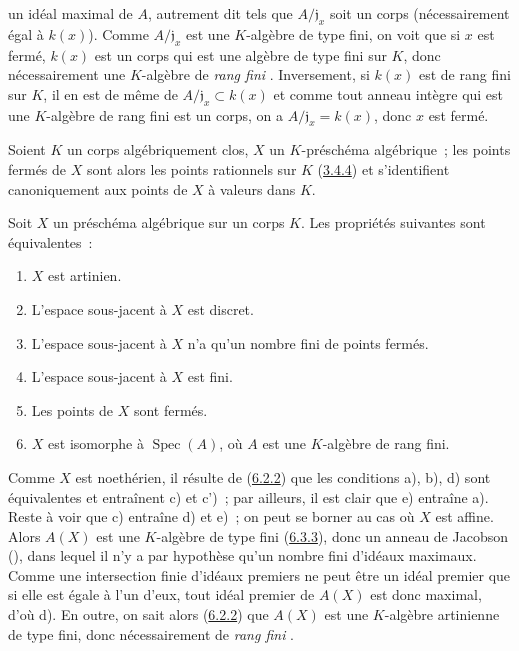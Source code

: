 un idéal maximal de $A$, autrement dit tels que $A/\mathfrak{j}_x$ soit un
corps (nécessairement égal à $k(x)$). Comme $A/\mathfrak{j}_x$ est une
$K$-algèbre de type fini, on voit que si $x$ est fermé, $k(x)$ est un corps
qui est une algèbre de type fini sur $K$, donc nécessairement une $K$-algèbre
de \emph{rang fini} \cite{I-21}. Inversement, si $k(x)$ est de rang fini sur
$K$, il en est de même de $A/\mathfrak{j}_x\subset k(x)$ et comme tout anneau
intègre qui est une $K$-algèbre de rang fini est un corps, on a
$A/\mathfrak{j}_x=k(x)$, donc $x$ est fermé.

\begin{corollary}[6.4.3]
\label{I.6.4.3-fr}
Soient $K$ un corps algébriquement clos, $X$ un $K$-préschéma algébrique~; les
points fermés de $X$ sont alors les points rationnels sur $K$
(\hyperref[I.3.4.4-fr]{3.4.4}) et s'identifient canoniquement aux points de
$X$ à valeurs dans $K$.
\end{corollary}

\begin{proposition}[6.4.4]
\label{I.6.4.4-fr}
Soit $X$ un préschéma algébrique sur un corps $K$. Les propriétés suivantes
sont équivalentes~:
\begin{enumerate}
  \item[\rm(a)] $X$ est artinien.
  \item[\rm(b)] L'espace sous-jacent à $X$ est discret.
  \item[\rm(c)] L'espace sous-jacent à $X$ n'a qu'un nombre fini de points
    fermés.
  \item[\rm(c')] L'espace sous-jacent à $X$ est fini.
  \item[\rm(d)] Les points de $X$ sont fermés.
  \item[\rm(e)] $X$ est isomorphe à $\operatorname{Spec}(A)$, où $A$ est une
    $K$-algèbre de rang fini.
\end{enumerate}
\end{proposition}

Comme $X$ est noethérien, il résulte de (\hyperref[I.6.2.2-fr]{6.2.2}) que
les conditions a), b), d) sont équivalentes et entraînent c) et c')~; par
ailleurs, il est clair que e) entraîne a). Reste à voir que c) entraîne d) et
e)~; on peut se borner au cas où $X$ est affine. Alors $A(X)$ est une
$K$-algèbre de type fini (\hyperref[I.6.3.3-fr]{6.3.3}), donc un anneau de
Jacobson (\cite[p.~3-11 et 3-12]{I-1}), dans lequel il n'y a par hypothèse
qu'un nombre fini d'idéaux maximaux. Comme une intersection finie d'idéaux
premiers ne peut être un idéal premier que si elle est égale à l'un d'eux,
tout idéal premier de $A(X)$ est donc maximal, d'où d). En outre, on sait
alors (\hyperref[I.6.2.2-fr]{6.2.2}) que $A(X)$ est une $K$-algèbre
artinienne de type fini, donc nécessairement de \emph{rang fini} \cite{I-21}.

